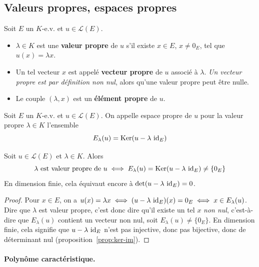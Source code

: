 \subsection{Valeurs propres, espaces propres}

\begin{defi}
\label{defi:elements-propres}
Soit $E$ un $K$-e.v. et $u\in\mathcal{L}(E)$.
\begin{itemize}
\item $\lambda\in K$ est une \textbf{valeur propre} de $u$ s'il existe $x\in E$, $x\neq 0_E$, tel que $u(x)=\lambda x$.
\item Un tel vecteur $x$ est appelé \textbf{vecteur propre} de $u$ associé à $\lambda$. \emph{Un vecteur propre est par définition non nul}, alors qu'une valeur propre peut être nulle.
\item Le couple $(\lambda,x)$ est un \textbf{élément propre} de $u$.
\end{itemize}
\end{defi}

\begin{defi}
\label{defi:espace-propre}
Soit $E$ un $K$-e.v. et $u\in\mathcal{L}(E)$. On appelle espace propre de $u$ pour la valeur propre $\lambda\in K$ l'ensemble
\[E_\lambda(u) = \operatorname{Ker}(u-\lambda\, \operatorname{id}_E)\]
\end{defi}

\begin{prop}[Critère]
\label{prop:critere-vp}
Soit $u\in\mathcal{L}(E)$ et $\lambda\in K$. Alors
\[\lambda \text{ est valeur propre de } u \iff E_\lambda(u) = \operatorname{Ker}(u-\lambda\,\operatorname{id}_E) \neq \{0_E\}\]
En dimension finie, cela équivaut encore à $\det(u-\lambda\,\operatorname{id}_E)=0$.
\end{prop}

\begin{proof}
Pour $x\in E$, on a $u(x)=\lambda x \iff (u-\lambda\,\operatorname{id}_E)(x)=0_E \iff x\in E_\lambda(u)$. Dire que $\lambda$ est valeur propre, c'est donc dire qu'il existe un tel $x$ \emph{non nul}, c'est-à-dire que $E_\lambda(u)$ contient un vecteur non nul, soit $E_\lambda(u)\neq\{0_E\}$. En dimension finie, cela signifie que $u-\lambda\,\operatorname{id}_E$ n'est pas injective, donc pas bijective, donc de déterminant nul (proposition~\ref{prop:ker-im}).
\end{proof}

\paragraph{Polynôme caractéristique.}

